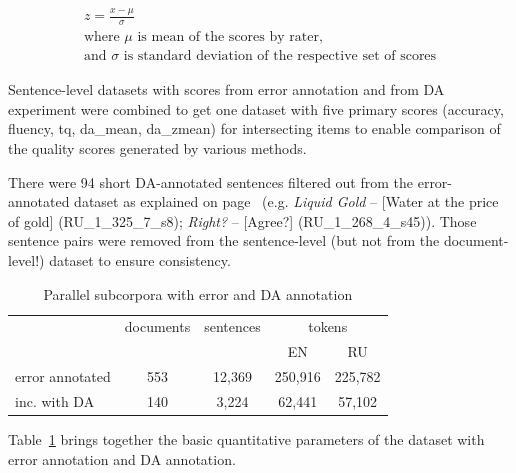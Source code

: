 
\begin{equation}\label{eq:zscore}
\begin{split}
z = \frac{x - \mu}{\sigma} \\
\text{where $\mu$ is mean of the scores by rater,} \\
\text{and $\sigma$ is standard deviation of the respective set of scores}
\end{split}
\end{equation}

Sentence-level datasets with scores from error annotation and from DA experiment were combined to get one dataset with five primary scores (accuracy, fluency, tq, da\_mean, da\_zmean) for intersecting items to enable comparison of the quality scores generated by various methods. 

There were 94 short DA-annotated sentences filtered out from the error-annotated dataset as explained on page~\pageref{pg:shorts_filtered_out} (e.g. \textit{Liquid Gold} --  [Water at the price of gold] (RU\_1\_325\_7\_s8); \textit{Right?} --  [Agree?] (RU\_1\_268\_4\_s45)).
Those sentence pairs were removed from the sentence-level (but not from the document-level!) dataset to ensure consistency.
\begin{table}[H]
	\centering
	\begin{tabular}{l|c|c|cc}
		\toprule
		
		& documents & sentences & \multicolumn{2}{c}{tokens} \\
		&      &        & EN      &  RU \\
		\midrule
		error annotated & 553  & 12,369 & 250,916 & 225,782 \\
		\hspace{1em} inc. with DA & 140  & 3,224 & 62,441 & 57,102 \\
		\bottomrule
	\end{tabular}
	\caption{\label{tab:sent_err_da} Parallel subcorpora with error and DA annotation}
\end{table}

\vspace*{-1em}
Table~\ref{tab:sent_err_da} brings together the basic quantitative parameters of the dataset with error annotation and DA annotation.

